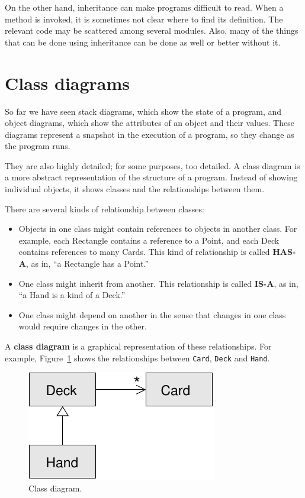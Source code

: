 \documentclass[10pt]{book}
\begin{document}
\begin{CJK}{UTF8}{gbsn}
On the other hand, inheritance can make programs difficult to read.
When a method is invoked, it is sometimes not clear where to find its
definition.  The relevant code may be scattered among several modules.
Also, many of the things that can be done using inheritance can be
done as well or better without it.  


\section{Class diagrams}
\label{class.diagram}

So far we have seen stack diagrams, which show the state of
a program, and object diagrams, which show the attributes
of an object and their values.  These diagrams represent a snapshot
in the execution of a program, so they change as the program
runs.

They are also highly detailed; for some purposes, too
detailed.  A class diagram is a more abstract representation
of the structure of a program.  Instead of showing individual
objects, it shows classes and the relationships between them.

There are several kinds of relationship between classes:

\begin{itemize}

\item Objects in one class might contain references to objects
in another class.  For example, each Rectangle contains a reference
to a Point, and each Deck contains references to many Cards.
This kind of relationship is called {\bf HAS-A}, as in, ``a Rectangle
has a Point.''

\item One class might inherit from another.  This relationship
is called {\bf IS-A}, as in, ``a Hand is a kind of a Deck.''

\item One class might depend on another in the sense that changes
in one class would require changes in the other.

\end{itemize}

A {\bf class diagram} is a graphical representation of these
relationships.  For example, Figure~\ref{fig.class1} shows the
relationships between {\tt Card}, {\tt Deck} and {\tt Hand}.

\begin{figure}
\centerline
{\includegraphics[scale=0.8]{figs/class1.pdf}}
\caption{Class diagram.}
\label{fig.class1}
\end{figure}



\end{CJK}
\end{document}
